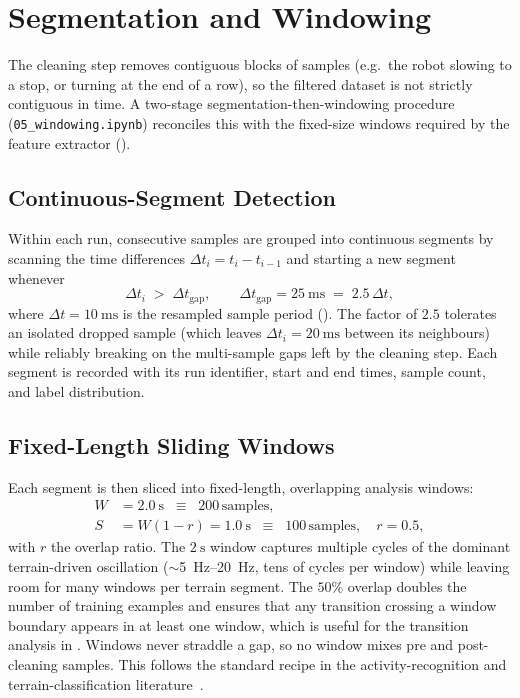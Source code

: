 \vspace{-8mm}
\section{Segmentation and Windowing}
\label{sec:windowing}

The cleaning step removes contiguous blocks of samples (e.g.\ the robot slowing to a stop, or turning at the end of a row), so the filtered dataset is not strictly contiguous in time. A two-stage segmentation-then-windowing procedure (\texttt{05\_windowing.ipynb}) reconciles this with the fixed-size windows required by the feature extractor ().

\subsection{Continuous-Segment Detection}

Within each run, consecutive samples are grouped into continuous segments by scanning the time differences $\Delta t_i = t_i - t_{i-1}$ and starting a new segment whenever
\begin{equation}
    \Delta t_i \;>\; \Delta t_{\mathrm{gap}}, \qquad
    \Delta t_{\mathrm{gap}} = \SI{25}{\milli\second} \;=\; 2.5\,\Delta t,
    \label{eq:gap_threshold}
\end{equation}
where $\Delta t = \SI{10}{\milli\second}$ is the resampled sample period (). The factor of $2.5$ tolerates an isolated dropped sample (which leaves $\Delta t_i = \SI{20}{\milli\second}$ between its neighbours) while reliably breaking on the multi-sample gaps left by the cleaning step. Each segment is recorded with its run identifier, start and end times, sample count, and label distribution.

\subsection{Fixed-Length Sliding Windows}

Each segment is then sliced into fixed-length, overlapping analysis windows:
\begin{align}
    W &= \SI{2.0}{\second} \;\;\equiv\;\; 200\,\text{samples},
        \label{eq:window_size} \\
    S &= W(1 - r) = \SI{1.0}{\second} \;\;\equiv\;\; 100\,\text{samples},
        \quad r = 0.5,
        \label{eq:step_size}
\end{align}
with $r$ the overlap ratio. The $\SI{2}{\second}$ window captures multiple cycles of the dominant terrain-driven oscillation ($\sim$\SIrange{5}{20}{\hertz}, tens of cycles per window) while leaving room for many windows per terrain segment. The $50\%$ overlap doubles the number of training examples and ensures that any transition crossing a window boundary appears in at least one window, which is useful for the transition analysis in . Windows never straddle a gap, so no window mixes pre and post-cleaning samples. This follows the standard recipe in the activity-recognition and terrain-classification literature~\cite{Brooks2005,Bao2004}.

